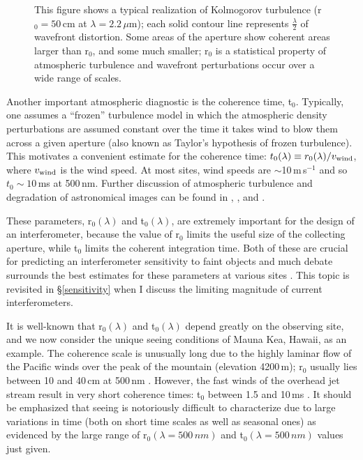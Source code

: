 \documentclass[12pt]{iopart}
\newcommand{\micronn}{\,\hbox{$\mu$m}}
\begin{document}
\begin{figure}
\begin{center}
\caption[bad atmosphere]{
This figure
shows a typical realization of Kolmogorov turbulence (r$_0 = 50$\,cm at
$\lambda = 2.2$\micronn); each
solid contour line represents $\frac{\lambda}{2}$ of wavefront distortion.
Some areas of the aperture show coherent areas larger
than r$_0$, and some much smaller; r$_0$ is a statistical property of
atmospheric turbulence and wavefront perturbations occur over a wide
range of scales.
\label{fig:phasescreen}}
\end{center}
\end{figure}

Another important atmospheric diagnostic is the coherence time, t$_0$.
Typically, one assumes a ``frozen'' turbulence model in which the
atmospheric density perturbations are assumed constant over the time
it takes wind to blow them across a given aperture (also known as
Taylor's hypothesis of frozen turbulence).  This motivates a convenient
estimate for the coherence time: $t_0(\lambda) \equiv r_0(\lambda) /
v_{\rm wind}$, where $v_{\rm wind}$ is the wind speed.  At most sites,
wind speeds are $\sim$10\,m\,s$^{-1}$ and so $t_0 \sim 10$\,ms at
500\,nm.  Further discussion of atmospheric turbulence and degradation
of astronomical images can be found in \citet{kolmogorov61},
\citet{roddier1981}, and \citet{roddier82}.

These parameters, r$_0(\lambda)$ and t$_0(\lambda)$, are extremely
important for the design of an interferometer, because the value of
r$_0$ limits the useful size of the collecting aperture, while t$_0$
limits the coherent integration time.  Both of these are crucial for
predicting an interferometer sensitivity to faint objects and much
debate surrounds the best estimates for these parameters at various
sites \citep[e.g.,][]{dyck83a, roddier90, theo1994, treuhaft95}.  This
topic is revisited in \S\ref{sensitivity} when I discuss the limiting
magnitude of current interferometers.

It is well-known that r$_0(\lambda)$ and t$_0(\lambda)$ depend greatly
on the observing site, and we now consider the unique seeing
conditions of Mauna Kea, Hawaii, as an example.  The coherence scale
is unusually long due to the highly laminar flow of the Pacific winds
over the peak of the mountain (elevation 4200\,m); r$_0$ usually lies
between 10 and 40\,cm at 500\,nm \citep{wizPC}.  However, the fast
winds of the overhead jet stream result in very short coherence times:
t$_0$ between 1.5 and 10\,ms \citep{wizPC}.  It should be emphasized
that seeing is notoriously difficult to characterize due to large
variations in time (both on short time scales as well as seasonal
ones) as evidenced by the large range of r$_0(\lambda = 500\,nm)$ and
t$_0(\lambda=500\,nm)$ values just given.
\end{document}
